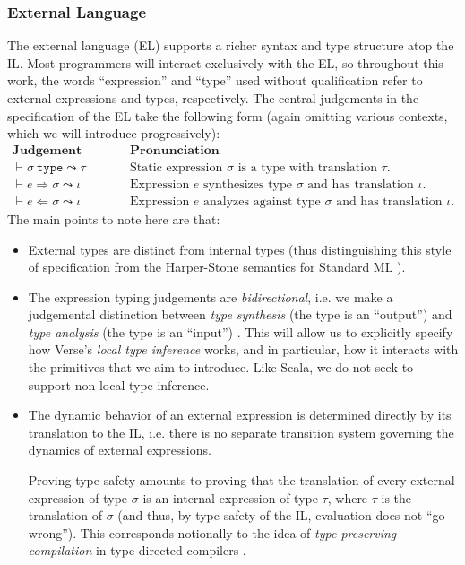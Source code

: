 \subsubsection{External Language}
The external language (EL) supports a richer syntax and type structure atop the IL. Most programmers will interact exclusively with the EL, so throughout this work, the words ``expression'' and ``type'' used without qualification refer to external expressions and types, respectively. The central judgements in the specification of the EL take the following form  (again omitting various contexts, which we will introduce progressively): 
\\[1ex]
$\begin{array}{ll}
\textbf{Judgement Form} & \textbf{Pronunciation}\\
\vdash \sigma~\mathtt{type} \leadsto \tau & \text{Static expression $\sigma$ is a type with translation $\tau$.}\\
\vdash e \Rightarrow \sigma \leadsto \iota & \text{Expression $e$ synthesizes type $\sigma$ and has translation $\iota$.}\\
\vdash e \Leftarrow \sigma \leadsto \iota & \text{Expression $e$ analyzes against type $\sigma$ and has translation $\iota$.}
\end{array}
$\\[1ex]The main points to note here are that:
\begin{itemize}
\item External types are distinct from internal types (thus distinguishing this style of specification from the Harper-Stone semantics for Standard ML \cite{Harper00atype-theoretic}).
\item The expression typing judgements are \emph{bidirectional}, i.e. we make a judgemental distinction between \emph{type synthesis} (the type is an ``output'') and \emph{type analysis} (the type is an ``input'') \cite{Pierce:2000:LTI:345099.345100}. This will  allow us to explicitly specify how Verse's \emph{local type inference} works, and in particular, how it interacts with the primitives that we aim to introduce. Like Scala, we do not seek to support non-local type inference. %
\item  The dynamic behavior of an external expression is determined directly by its translation to the IL, i.e. there is no separate transition system governing the dynamics of external expressions. 

Proving type safety amounts to proving that the translation of every external expression of type $\sigma$ is an internal expression of type $\tau$, where $\tau$ is the translation of $\sigma$ (and thus, by type safety of the IL, evaluation does not ``go wrong''). This corresponds notionally to the idea of \emph{type-preserving compilation} in type-directed compilers \cite{tarditi+:til-OLD}.
\end{itemize}

